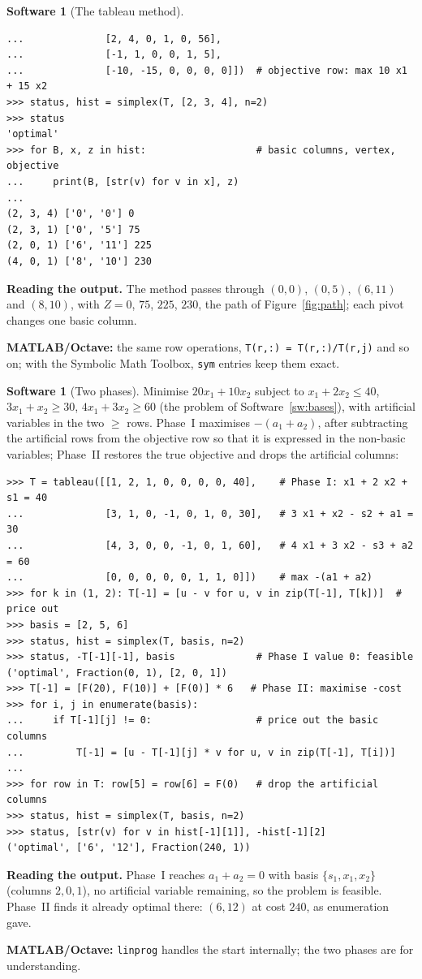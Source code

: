 \documentclass[11pt,a4paper]{article}
\numberwithin{equation}{section}
\theoremstyle{definition}
\newtheorem{software}[thm]{Software}
\begin{document}
\begin{software}[The tableau method]
{\begin{verbatim}
...              [2, 4, 0, 1, 0, 56],
...              [-1, 1, 0, 0, 1, 5],
...              [-10, -15, 0, 0, 0, 0]])  # objective row: max 10 x1 + 15 x2
>>> status, hist = simplex(T, [2, 3, 4], n=2)
>>> status
'optimal'
>>> for B, x, z in hist:                   # basic columns, vertex, objective
...     print(B, [str(v) for v in x], z)
...
(2, 3, 4) ['0', '0'] 0
(2, 3, 1) ['0', '5'] 75
(2, 0, 1) ['6', '11'] 225
(4, 0, 1) ['8', '10'] 230
\end{verbatim}}
\textbf{Reading the output.} The method passes through $(0, 0)$, $(0, 5)$, $(6, 11)$ and $(8, 10)$, with $Z = 0$, $75$, $225$, $230$, the path of Figure~\ref{fig:path}; each pivot changes one basic column.

\textbf{MATLAB/Octave:} the same row operations, \texttt{T(r,:) = T(r,:)/T(r,j)} and so on; with the Symbolic Math Toolbox, \texttt{sym} entries keep them exact.
\end{software}

\begin{software}[Two phases]
\label{sw:twophase}
Minimise $20x_1 + 10x_2$ subject to $x_1 + 2x_2 \leq 40$, $3x_1 + x_2 \geq 30$, $4x_1 + 3x_2 \geq 60$ (the problem of Software~\ref{sw:bases}), with artificial variables in the two $\geq$ rows. Phase~I maximises $-(a_1 + a_2)$, after subtracting the artificial rows from the objective row so that it is
expressed in the non-basic variables; Phase~II restores the true objective and drops the artificial columns:
{\small\begin{verbatim}
>>> T = tableau([[1, 2, 1, 0, 0, 0, 0, 40],    # Phase I: x1 + 2 x2 + s1 = 40
...              [3, 1, 0, -1, 0, 1, 0, 30],   # 3 x1 + x2 - s2 + a1 = 30
...              [4, 3, 0, 0, -1, 0, 1, 60],   # 4 x1 + 3 x2 - s3 + a2 = 60
...              [0, 0, 0, 0, 0, 1, 1, 0]])    # max -(a1 + a2)
>>> for k in (1, 2): T[-1] = [u - v for u, v in zip(T[-1], T[k])]  # price out
>>> basis = [2, 5, 6]
>>> status, hist = simplex(T, basis, n=2)
>>> status, -T[-1][-1], basis              # Phase I value 0: feasible
('optimal', Fraction(0, 1), [2, 0, 1])
>>> T[-1] = [F(20), F(10)] + [F(0)] * 6   # Phase II: maximise -cost
>>> for i, j in enumerate(basis):
...     if T[-1][j] != 0:                  # price out the basic columns
...         T[-1] = [u - T[-1][j] * v for u, v in zip(T[-1], T[i])]
...
>>> for row in T: row[5] = row[6] = F(0)   # drop the artificial columns
>>> status, hist = simplex(T, basis, n=2)
>>> status, [str(v) for v in hist[-1][1]], -hist[-1][2]
('optimal', ['6', '12'], Fraction(240, 1))
\end{verbatim}}
\textbf{Reading the output.} Phase~I reaches $a_1 + a_2 = 0$ with basis $\{s_1, x_1, x_2\}$ (columns $2, 0, 1$), no artificial variable remaining, so the problem is feasible. Phase~II finds it already optimal there: $(6, 12)$ at cost $240$, as enumeration gave.

\textbf{MATLAB/Octave:} \texttt{linprog} handles the start internally; the two phases are for understanding.
\end{software}
\end{document}
